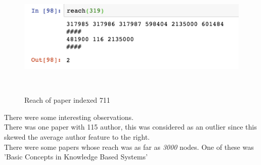 \documentclass[a4paper, 11pt]{article}
\begin{document}
\begin{figure}[ht]
  \includegraphics[width=0.6\columnwidth]{Reach.png}
  \caption{Reach of paper indexed 711}~\label{fig:Reach}
\end{figure}
\FloatBarrier
There were some interesting observations.\\

There was one paper with 115 author, this was considered as an outlier since this skewed the average author feature to the right. \\

There were some papers whose reach was as far as \textit{3000} nodes. One of these was  'Basic Concepts in Knowledge Based Systems'

\end{document}
